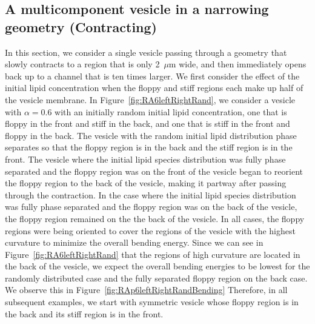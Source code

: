 \documentclass[twoside,twocolumn,9pt]{article}
\begin{document}
\subsection{\label{subsec:Contraction} A multicomponent vesicle in a narrowing geometry (Contracting)}
In this section, we consider a single vesicle passing through a geometry that slowly contracts to a region that is only 2~$\mu$m wide, and then immediately opens back up to a channel that is ten times larger. We first consider the effect of the initial lipid concentration when the floppy and stiff regions each make up half of the vesicle membrane. In Figure~\ref{fig:RA6leftRightRand}, we consider a vesicle with $\alpha = 0.6$ with an initially random initial lipid concentration, one that is floppy in the front and stiff in the back, and one that is stiff in the front and floppy in the back. The vesicle with the random initial lipid distribution phase separates so that the floppy region is in the back and the stiff region is in the front. The vesicle where the initial lipid species distribution was fully phase separated and the floppy region was on the front of the vesicle began to reorient the floppy region to the back of the vesicle, making it partway after passing through the contraction. In the case where the initial lipid species distribution was fully phase separated and the floppy region was on the back of the vesicle, the floppy region remained on the the back of the vesicle. In all cases, the floppy regions were being oriented to cover the regions of the vesicle with the highest curvature to minimize the overall bending energy. Since we can see in Figure~\ref{fig:RA6leftRightRand} that the regions of high curvature are located in the back of the vesicle, we expect the overall bending energies to be lowest for the randomly distributed case and the fully separated floppy region on the back case. We observe this in Figure~\ref{fig:RAp6leftRightRandBending} Therefore, in all subsequent examples, we start with symmetric vesicle whose floppy region is in the back and its stiff region is in the front.
\end{document}
